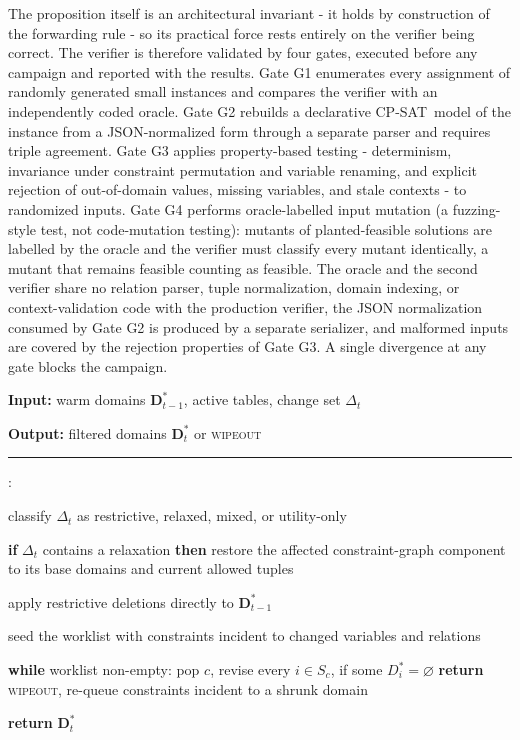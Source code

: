 \documentclass[pdflatex,sn-mathphys-num,iicol,oneside]{sn-jnl}
\newcommand{\algin}[1]{\textbf{Input:} #1\par}
\newcommand{\algout}[1]{\textbf{Output:} #1\par\vspace{2pt}\hrule\vspace{3pt}}
\newenvironment{algsteps}%
  {\begin{list}{\arabic{algstepc}:}%
     {\usecounter{algstepc}\setlength{\leftmargin}{1.6em}%
      \setlength{\itemsep}{1pt}\setlength{\parsep}{0pt}}}%
  {\end{list}}
\newcounter{algstepc}
\newcommand{\cpsat}{\textsc{CP-SAT}}
\begin{document}
The proposition itself is an architectural invariant - it holds by
construction of the forwarding rule - so its practical force rests
entirely on the verifier being correct. The verifier is therefore
validated by four gates, executed before any campaign and reported
with the results. Gate G1 enumerates every assignment of randomly
generated small instances and compares the verifier with an
independently coded oracle. Gate G2 rebuilds a declarative \cpsat\
model of the instance from a JSON-normalized form through a separate
parser and requires triple agreement. Gate G3 applies property-based
testing - determinism, invariance under constraint permutation and
variable renaming, and explicit rejection of out-of-domain values,
missing variables, and stale contexts - to randomized inputs. Gate G4
performs oracle-labelled input mutation (a fuzzing-style test, not
code-mutation testing): mutants of planted-feasible solutions are
labelled by the oracle and the verifier must classify every mutant
identically, a mutant that remains feasible counting as feasible. The
oracle and the second verifier share no relation parser, tuple
normalization, domain indexing, or context-validation code with the
production verifier, the JSON normalization consumed by Gate G2 is
produced by a separate serializer, and malformed inputs are covered by
the rejection properties of Gate G3. A single divergence at any gate
blocks the campaign.

\begin{algorithm}[t]
\caption{Incremental GAC with restoration after relaxation}
\label{alg:incgac}
\small
\algin{warm domains $\bm{D}^{*}_{t-1}$, active tables, change set $\Delta_t$}
\algout{filtered domains $\bm{D}^{*}_t$ or \textsc{wipeout}}
\begin{algsteps}
\item classify $\Delta_t$ as restrictive, relaxed, mixed, or utility-only
\item \textbf{if} $\Delta_t$ contains a relaxation \textbf{then} restore
the affected constraint-graph component to its base domains and current
allowed tuples
\item apply restrictive deletions directly to $\bm{D}^{*}_{t-1}$
\item seed the worklist with constraints incident to changed variables
and relations
\item \textbf{while} worklist non-empty: pop $c$, revise every
$i\in S_c$, if some $D_i^{*}=\varnothing$ \textbf{return}
\textsc{wipeout}, re-queue constraints incident to a shrunk domain
\item \textbf{return} $\bm{D}^{*}_t$
\end{algsteps}
\end{algorithm}
\end{document}

